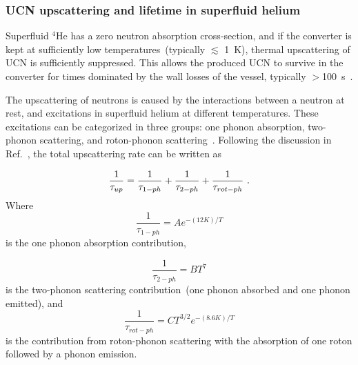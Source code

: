 \subsubsection{UCN upscattering and lifetime in superfluid
  helium~\label{sec:upscattering}}



Superfluid $^4$He has a zero neutron absorption cross-section, and if
the converter is kept at sufficiently low temperatures~(typically
$\lesssim$ 1~K), thermal upscattering of UCN is sufficiently
suppressed. This allows the produced UCN to survive in the converter
for times dominated by the wall losses of the vessel, typically
$>$100~s~\cite{Leung2016}.

The upscattering of neutrons is caused by the interactions between a
neutron at rest, and excitations in superfluid helium at different
temperatures. These excitations can be categorized in three groups:
one phonon absorption, two-phonon scattering, and roton-phonon
scattering~\cite{Leung2016}. Following the discussion in
Ref.~\cite{Leung2016}, the total upscattering rate can be written as

\begin{equation}
\label{eqn:hE_{UCN}pscattering}
\frac{1}{\tau_{up}} =
\frac{1}{\tau_{1-ph}}+\frac{1}{\tau_{2-ph}}+\frac{1}{\tau_{rot-ph}}~.
\end{equation}
Where 
\begin{equation}
\label{eqn:1ph}
\frac{1}{\tau_{1-ph}}= A e^{-(12 K)/T}
\end{equation}
is the one phonon absorption contribution, 

\begin{equation}
\label{eqn:2ph}
\frac{1}{\tau_{2-ph}}= BT^7
\end{equation}
is the two-phonon scattering contribution~(one phonon absorbed and one
phonon emitted), and
\begin{equation}
\label{eqn:ph-rtn}
\frac{1}{\tau_{rot-ph}}= CT^{3/2}e^{-(8.6 K)/T}
\end{equation}
is the contribution from roton-phonon scattering with the absorption
of one roton followed by a phonon emission.

